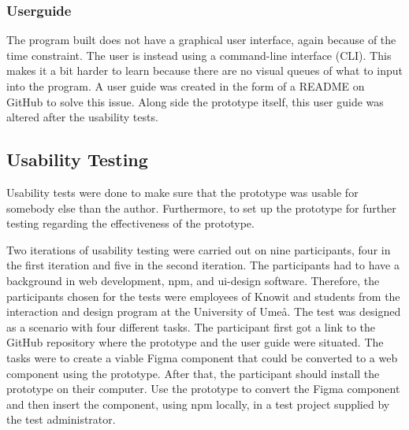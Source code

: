 \subsubsection{Userguide}%
\label{ssub:Userguide}
The program built does not have a graphical user interface, again because of the time constraint. The user is instead using a command-line interface (CLI). This makes it a bit harder to learn because there are no visual queues of what to input into the program.  A user guide was created in the form of a README on GitHub\cite{BuildSoftwareBetter} to solve this issue. Along side the prototype itself, this user guide was altered after the usability tests.










\subsection{Usability Testing}%
\label{sub:usertesting}
Usability tests were done to make sure that the prototype was usable for somebody else than the author. Furthermore, to set up the prototype for further testing regarding the effectiveness of the prototype.

Two iterations of usability testing were carried out on nine participants, four in the first iteration and five in the second iteration. The participants had to have a background in web development, \acrshort{npm}, and \acrshort{ui}-design software. Therefore, the participants chosen for the tests were employees of Knowit and students from the interaction and design program at the University of Umeå. The test was designed as a scenario with four different tasks. The participant first got a link to the GitHub repository where the prototype and the user guide were situated. The tasks were to create a viable Figma \gls{component} that could be converted to a web \gls{component} using the prototype. After that, the participant should install the prototype on their computer. Use the prototype to convert the Figma \gls{component} and then insert the \gls{component}, using \acrshort{npm} locally, in a test project supplied by the test administrator.

